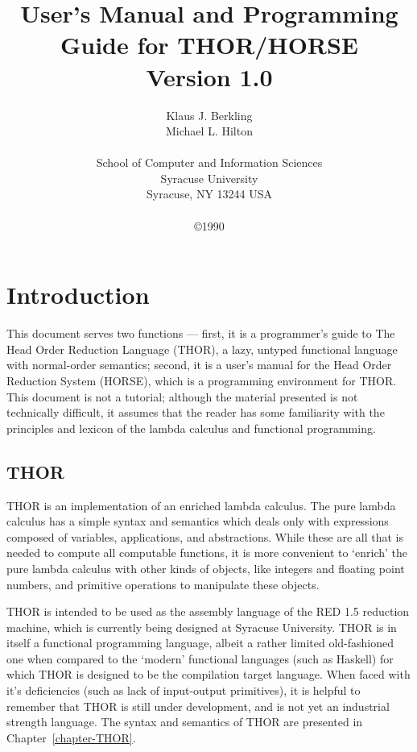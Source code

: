 \title{User's Manual and Programming Guide for THOR/HORSE \\ Version 1.0}
\author{Klaus J. Berkling \\ Michael L. Hilton \\ \\ School of Computer and Information Sciences \\
Syracuse University\\Syracuse, NY 13244  USA \\ \\
\copyright 1990}


\maketitle
\tableofcontents

\chapter{Introduction}

	This document serves two functions ---  first, it is a
programmer's guide to The Head Order Reduction Language
(THOR), a lazy, untyped functional language with normal-order semantics;
second, it is a
user's manual for the Head Order Reduction System (HORSE), which
is a programming environment for  THOR.  This document is not a
tutorial; although the material presented is not technically
difficult, it assumes that the reader has some familiarity
with the principles and lexicon of the lambda calculus and functional
programming.


\section{THOR}

	THOR is an implementation of an enriched lambda calculus. 
The pure lambda calculus has a
simple syntax and semantics which deals only with expressions
composed of variables, applications, and abstractions.  While
these are all that is needed to compute all computable functions,
it is more convenient to `enrich' the pure lambda calculus with
other kinds of objects, like integers and floating point numbers,
and primitive operations to manipulate these objects.

	THOR is intended to be used as the assembly language of the
RED 1.5 reduction machine, which is currently being designed at
Syracuse University.  THOR is in itself a functional
programming language, albeit a rather limited old-fashioned one when
compared to the `modern' functional languages (such as
Haskell) for which THOR is designed to be the compilation target language.
  When faced with it's deficiencies (such as lack of input-output
primitives), it is helpful to remember that THOR is still under
development, and is not yet an industrial strength language.
The syntax and semantics of THOR are presented in 
Chapter~\ref{chapter-THOR}.

